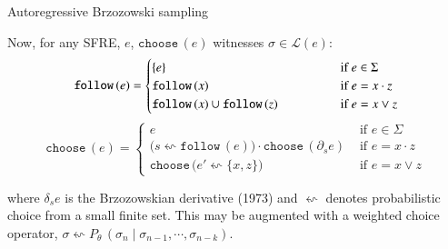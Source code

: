 \documentclass{beamer}
\begin{document}
\begin{frame}{Autoregressive Brzozowski sampling}

  Now, for any SFRE, \(e\), $\texttt{choose}\,(e)$ witnesses $\sigma \in \mathcal{L}(e)$:
  \begin{equation*}
    \texttt{follow}\,(e) = \begin{cases}
           \{e\}                                        &\hspace{1.3cm}\text{ if } e \in \Sigma \\
           \texttt{follow}\,(x)                         &\hspace{1.3cm}\text{ if } e = x \cdot z\\
           \texttt{follow}\,(x)\cup\texttt{follow}\,(z) &\hspace{1.3cm}\text{ if } e = x \lor z
    \end{cases}
  \end{equation*}
  \begin{equation*}\label{eq:choose}
    \texttt{choose}\,(e) = \begin{cases}
         e &\text{ if } e \in \Sigma \\
         \big(s \leftsquigarrow \texttt{follow}\,(e)\big)\cdot \texttt{choose}\,(\partial_s e) &\text{ if } e = x \cdot z\\
         \texttt{choose}\,\big(e' \leftsquigarrow \{x, z\}\big) &\text{ if } e = x \lor z
    \end{cases}
  \end{equation*}
\vspace{0.2cm}

  where $\delta_s e$ is the Brzozowskian derivative (1973) and $\leftsquigarrow$ denotes probabilistic choice from a small finite set. This may be augmented with a weighted choice operator, $\sigma \leftsquigarrow P_\theta\,(\sigma_{n} \mid  \sigma_{n-1}, \cdots, \sigma_{n - k})$.
\end{frame}
\end{document}
